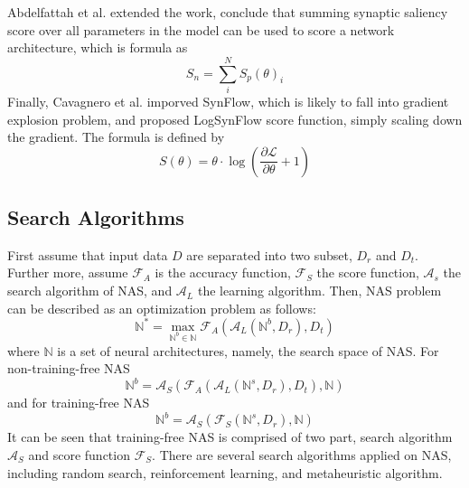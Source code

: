 \documentclass[sigconf]{acmart}
\begin{document}
    Abdelfattah et al. \cite{abdelfattah2021zerocost} extended the work, conclude that summing 
    synaptic saliency score over all parameters in the model can be used to score a network 
    architecture, which is formula as 
    \begin{equation}
        \label{equ:zero_cost}
        S_n=\sum^N_i S_p(\theta)_i
    \end{equation}
    Finally, Cavagnero et al. \cite{Cavagnero_2023} imporved SynFlow, which is likely to fall into 
    gradient explosion problem, and proposed LogSynFlow score function, simply scaling down the gradient. 
    The formula is defined by 
    \begin{equation}
        \label{equ:logsynflow}
        S(\theta)=\theta\cdot\log(\frac{\partial \mathcal L}{\partial \theta}+1)
    \end{equation}

    \subsection{Search Algorithms}
    First assume that input data $D$ are separated into two subset, $D_r$ and $D_t$. Further more, 
    assume $\mathcal F_A$ is the accuracy function, $\mathcal F_S$ the score function, $\mathcal A_s$ the 
    search algorithm of NAS, and $\mathcal A_L$ the learning algorithm. Then, NAS problem can be 
    described as an optimization problem as follows: 
    \begin{equation}
        \label{equ:nas}
        \mathbb N^*=\max_{\mathbb N^b\in\mathbb N}\mathcal F_A(\mathcal A_L(\mathbb N^b, D_r), D_t)
    \end{equation}
    where $\mathbb N$ is a set of neural architectures, namely, the search space of NAS. 
    For non-training-free NAS 
    \begin{equation}
        \label{equ:non-training_free_nas}
        \mathbb N^b=\mathcal A_S(\mathcal F_A(\mathcal A_L(\mathbb N^s, D_r), D_t), \mathbb N)
    \end{equation}
    and for training-free NAS 
    \begin{equation}
        \label{equ:training_free_nas}
        \mathbb N^b=\mathcal A_S(\mathcal F_S(\mathbb N^s, D_r), \mathbb N)
    \end{equation}
    It can be seen that training-free NAS is comprised of two part, search algorithm $\mathcal A_S$ and score 
    function $\mathcal F_S$. 
    There are several search algorithms applied on NAS, including random search, reinforcement learning, and
    metaheuristic algorithm. 
    
\end{document}
